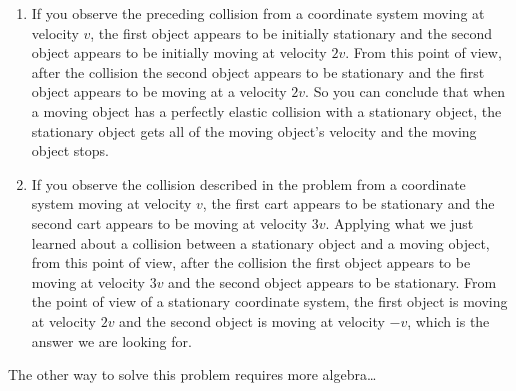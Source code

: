 \documentclass[fleqn,addpoints]{exam}
\begin{document}
\begin{questions}
\begin{solution}
\begin{enumerate}
\item If you observe the preceding collision from a coordinate system moving at velocity $v$, the first object appears to be
  initially stationary and the second object appears to be initially moving at velocity $2v$.  From this point of view,
  after the collision the second object appears to be stationary and the first object appears to be moving at a velocity
  $2v$.  So you can conclude that when a moving object has a perfectly elastic collision with a stationary object, the
  stationary object gets all of the moving object's velocity and the moving object stops.

\item If you observe the collision described in the problem from a coordinate system moving at velocity $v$, the first
  cart appears to be stationary and the second cart appears to be moving at velocity $3v$.  Applying what we just
  learned about a collision between a stationary object and a moving object, from this point of view, after the
  collision the first object appears to be moving at velocity $3v$ and the second object appears to be stationary.  From
  the point of view of a stationary coordinate system, the first object is moving at velocity $2v$ and the second object
  is moving at velocity $-v$, which is the answer we are looking for.
\end{enumerate}

The other way to solve this problem requires more algebra\ldots


\end{solution}
\end{questions}
\end{document}
